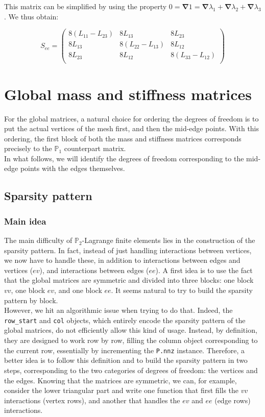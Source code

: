 \documentclass{article}
\theoremstyle{definition}
\theoremstyle{proposition}
\theoremstyle{theorem}
\theoremstyle{remark}
\theoremstyle{corollary}  %
\theoremstyle{exercise}
\theoremstyle{lemma}
\begin{document}
This matrix can be simplified by using the property $0 = \bm \nabla 1 = \bm \nabla \lambda_1 + \bm \nabla \lambda_2 + \bm \nabla \lambda_3$. We thus obtain:

$$S_{ee} = \begin{pmatrix}
8(L_{11} - L_{23}) & 8L_{13} & 8L_{23} \\
8L_{13} &  8(L_{22} - L_{13}) & 8L_{12} \\
8L_{23} & 8L_{12} &  8(L_{33} - L_{12})\\
\end{pmatrix}$$

\section{Global mass and stiffness matrices}

For the global matrices, a natural choice for ordering the degrees of freedom is to put the actual vertices of the mesh first, and then the mid-edge points. With this ordering, the first block of both the mass and stiffness matrices corresponds precisely to the $\mathbb{P}_1$ counterpart matrix. \\

In what follows, we will identify the degrees of freedom corresponding to the mid-edge points with the edges themselves.

\subsection{Sparsity pattern}

\subsubsection{Main idea}

The main difficulty of $\mathbb{P}_2$-Lagrange finite elements lies in the construction of the sparsity pattern. In fact, instead of just handling interactions between vertices, we now have to handle these, in addition to interactions between edges and vertices ($ev$), and interactions between edges ($ee$). A first idea is to use the fact that the global matrices are symmetric and divided into three blocks: one block $vv$, one block $ev$, and one block $ee$. It seems natural to try to build the sparsity pattern by block. \\

However, we hit an algorithmic issue when trying to do that. Indeed, the \texttt{row\_start} and \texttt{col} objects, which entirely encode the sparsity pattern of the global matrices, do not efficiently allow this kind of usage. Instead, by definition, they are designed to work row by row, filling the column object corresponding to the current row, essentially by incrementing the \texttt{P.nnz} instance. Therefore, a better idea is to follow this definition and to build the sparsity pattern in two steps, corresponding to the two categories of degrees of freedom: the vertices and the edges. Knowing that the matrices are symmetric, we can, for example, consider the lower triangular part and write one function that first fills the $vv$ interactions (vertex rows), and another that handles the $ev$ and $ee$ (edge rows) interactions.
\end{document}
